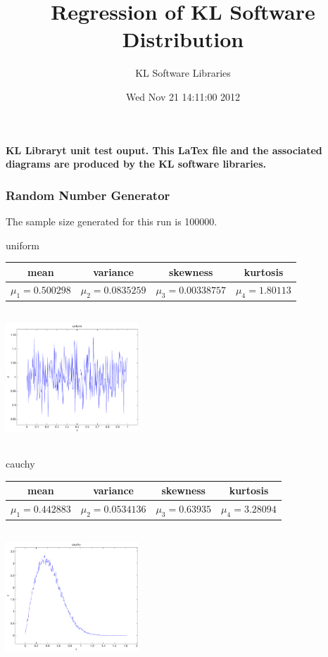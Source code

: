 \documentclass[12pt]{article}
\theoremstyle{definition}
\theoremstyle{remark}
\numberwithin{equation}{section}
\begin{document}
\title{Regression of KL Software Distribution   }
\author{KL Software Libraries}
\date{Wed Nov 21 14:11:00 2012
}
\maketitle
\textbf{ KL Libraryt unit test ouput.  This LaTex file and the associated diagrams 		are produced by the KL software libraries.}
\subsubsection{Random Number Generator }
The sample size generated for this run is 100000.

\newpage
uniform \begin{tabular}{|c|c|c|c|}  mean & variance & skewness & kurtosis \\  \hline
$\mu_1 = 0.500298$ & $\mu_2 = 0.0835259$ & $\mu_3 = 0.00338757$ & $\mu_4 =1.80113$ \\
\end{tabular}

\includegraphics[width=5cm,height=5cm]{uniform.pdf}

cauchy \begin{tabular}{|c|c|c|c|}  mean & variance & skewness & kurtosis \\  \hline
$\mu_1 = 0.442883$ & $\mu_2 = 0.0534136$ & $\mu_3 = 0.63935$ & $\mu_4 =3.28094$ \\
\end{tabular}

\includegraphics[width=5cm,height=5cm]{cauchy.pdf}
\end{document}
